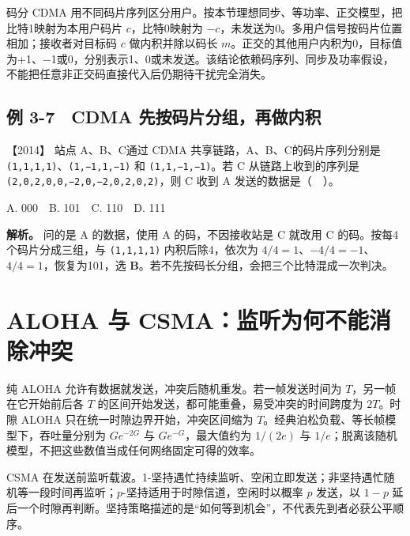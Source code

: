码分 CDMA 用不同码片序列区分用户。按本节理想同步、等功率、正交模型，把比特1映射为本用户码片 \(c\)，比特0映射为 \(-c\)，未发送为0。多用户信号按码片位置相加；接收者对目标码 \(c\) 做内积并除以码长 \(m\)。正交的其他用户内积为0，目标值为+1、−1或0，分别表示1、0或未发送。该结论依赖码序列、同步及功率假设，不能把任意非正交码直接代入后仍期待干扰完全消失。

\subsection{例 3-7　CDMA 先按码片分组，再做内积}\label{cn-ex3-7}

\noindent{}【2014】 站点 A、B、C通过 CDMA 共享链路，A、B、C的码片序列分别是 \allowbreak{}\texttt{(1,}\allowbreak{}\texttt{1,}\allowbreak{}\texttt{1,}\allowbreak{}\texttt{1)}、\allowbreak{}\texttt{(1,}\allowbreak{}\texttt{−1,}\allowbreak{}\texttt{1,}\allowbreak{}\texttt{−1)} 和 \allowbreak{}\texttt{(1,}\allowbreak{}\texttt{1,}\allowbreak{}\texttt{−1,}\allowbreak{}\texttt{−1)}。若 C 从链路上收到的序列是 \allowbreak{}\texttt{(2,}\allowbreak{}\texttt{0,}\allowbreak{}\texttt{2,}\allowbreak{}\texttt{0,}\allowbreak{}\texttt{0,}\allowbreak{}\texttt{−2,}\allowbreak{}\texttt{0,}\allowbreak{}\texttt{−2,}\allowbreak{}\texttt{0,}\allowbreak{}\texttt{2,}\allowbreak{}\texttt{0,}\allowbreak{}\texttt{2)}，则 C 收到 A 发送的数据是（　）。

A. 000　B. 101　C. 110　D. 111


\textbf{解析。} 问的是 A 的数据，使用 A 的码，不因接收站是 C 就改用 C 的码。按每4个码片分成三组，与 \allowbreak{}\texttt{(1,}\allowbreak{}\texttt{1,}\allowbreak{}\texttt{1,}\allowbreak{}\texttt{1)} 内积后除4，依次为 \(4/4=1\)、\(-4/4=-1\)、\(4/4=1\)，恢复为101，选 \textbf{B}。若不先按码长分组，会把三个比特混成一次判决。

\section{ALOHA 与 CSMA：监听为何不能消除冲突}\label{cn-03-10}

纯 ALOHA 允许有数据就发送，冲突后随机重发。若一帧发送时间为 \(T\)，另一帧在它开始前后各 \(T\) 的区间开始发送，都可能重叠，易受冲突的时间跨度为 \(2T\)。时隙 ALOHA 只在统一时隙边界开始，冲突区间缩为 \(T\)。经典泊松负载、等长帧模型下，吞吐量分别为 \(Ge^{-2G}\) 与 \(Ge^{-G}\)，最大值约为 \(1/(2e)\) 与 \(1/e\)；脱离该随机模型，不把这些数值当成任何网络固定可得的效率。

CSMA 在发送前监听载波。1-坚持遇忙持续监听、空闲立即发送；非坚持遇忙随机等一段时间再监听；\(p\)-坚持适用于时隙信道，空闲时以概率 \(p\) 发送，以 \(1-p\) 延后一个时隙再判断。坚持策略描述的是``如何等到机会''，不代表先到者必获公平顺序。

